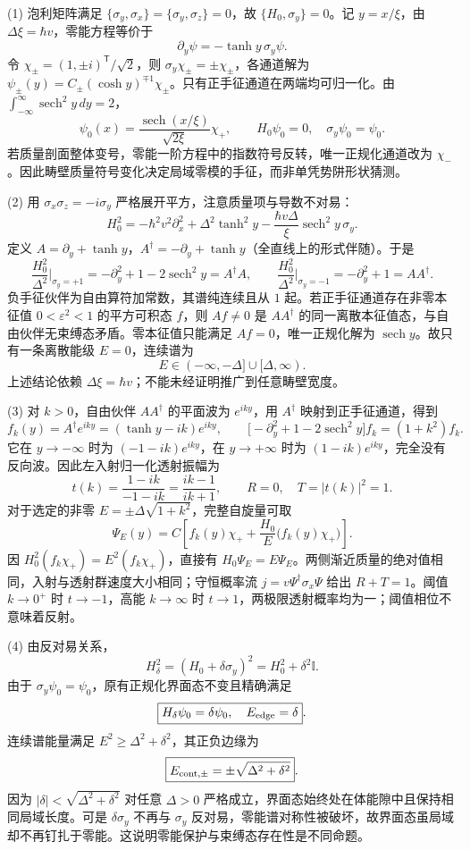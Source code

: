 (1) 泡利矩阵满足 \(\{\sigma_y,\sigma_x\}=\{\sigma_y,\sigma_z\}=0\)，故 \(\{H_0,\sigma_y\}=0\)。记 \(y=x/\xi\)，由 \(\Delta\xi=\hbar v\)，零能方程等价于
\[
\partial_y\psi=-\tanh y\,\sigma_y\psi .
\]
令 \(\chi_\pm=(1,\pm i)^{\mathsf T}/\sqrt2\)，则 \(\sigma_y\chi_\pm=\pm\chi_\pm\)，各通道解为 \(\psi_\pm(y)=C_\pm(\cosh y)^{\mp1}\chi_\pm\)。只有正手征通道在两端均可归一化。由 \(\int_{-\infty}^{\infty}\operatorname{sech}^2y\,dy=2\)，
\[
\boxed{\psi_0(x)=\frac{\operatorname{sech}(x/\xi)}{\sqrt{2\xi}}\chi_+},\qquad
\boxed{H_0\psi_0=0,\quad\sigma_y\psi_0=\psi_0}.
\]
若质量剖面整体变号，零能一阶方程中的指数符号反转，唯一正规化通道改为 \(\chi_-\)。因此畴壁质量符号变化决定局域零模的手征，而非单凭势阱形状猜测。

(2) 用 \(\sigma_x\sigma_z=-i\sigma_y\) 严格展开平方，注意质量项与导数不对易：
\[
H_0^2=-\hbar^2v^2\partial_x^2+\Delta^2\tanh^2y
-\frac{\hbar v\Delta}{\xi}\operatorname{sech}^2y\,\sigma_y .
\]
定义 \(A=\partial_y+\tanh y\)，\(A^\dagger=-\partial_y+\tanh y\)（全直线上的形式伴随）。于是
\[
\frac{H_0^2}{\Delta^2}\Big|_{\sigma_y=+1}
=-\partial_y^2+1-2\operatorname{sech}^2y=A^\dagger A,\qquad
\frac{H_0^2}{\Delta^2}\Big|_{\sigma_y=-1}
=-\partial_y^2+1=AA^\dagger .
\]
负手征伙伴为自由算符加常数，其谱纯连续且从 \(1\) 起。若正手征通道存在非零本征值 \(0<\varepsilon^2<1\) 的平方可积态 \(f\)，则 \(Af\ne0\) 是 \(AA^\dagger\) 的同一离散本征值态，与自由伙伴无束缚态矛盾。零本征值只能满足 \(Af=0\)，唯一正规化解为 \(\operatorname{sech}y\)。故只有一条离散能级 \(E=0\)，连续谱为
\[
\boxed{E\in(-\infty,-\Delta]\cup[\Delta,\infty)}.
\]
上述结论依赖 \(\Delta\xi=\hbar v\)；不能未经证明推广到任意畴壁宽度。

(3) 对 \(k>0\)，自由伙伴 \(AA^\dagger\) 的平面波为 \(e^{iky}\)，用 \(A^\dagger\) 映射到正手征通道，得到
\[
f_k(y)=A^\dagger e^{iky}=(\tanh y-ik)e^{iky},\qquad
\bigl[-\partial_y^2+1-2\operatorname{sech}^2y\bigr]f_k=(1+k^2)f_k.
\]
它在 \(y\to-\infty\) 时为 \((-1-ik)e^{iky}\)，在 \(y\to+\infty\) 时为 \((1-ik)e^{iky}\)，完全没有反向波。因此左入射归一化透射振幅为
\[
\boxed{t(k)=\frac{1-ik}{-1-ik}=\frac{ik-1}{ik+1}},\qquad
\boxed{R=0,\quad T=|t(k)|^2=1}.
\]
对于选定的非零 \(E=\pm\Delta\sqrt{1+k^2}\)，完整自旋量可取
\[
\Psi_E(y)=C\left[f_k(y)\chi_+
+\frac{H_0}{E}\bigl(f_k(y)\chi_+\bigr)\right].
\]
因 \(H_0^2(f_k\chi_+)=E^2(f_k\chi_+)\)，直接有 \(H_0\Psi_E=E\Psi_E\)。两侧渐近质量的绝对值相同，入射与透射群速度大小相同；守恒概率流 \(j=v\Psi^\dagger\sigma_x\Psi\) 给出 \(R+T=1\)。阈值 \(k\to0^+\) 时 \(t\to-1\)，高能 \(k\to\infty\) 时 \(t\to1\)，两极限透射概率均为一；阈值相位不意味着反射。

(4) 由反对易关系，
\[
H_\delta^2=(H_0+\delta\sigma_y)^2=H_0^2+\delta^2\mathbb I.
\]
由于 \(\sigma_y\psi_0=\psi_0\)，原有正规化界面态不变且精确满足
\[
\boxed{H_\delta\psi_0=\delta\psi_0,\quad E_{\rm edge}=\delta}.
\]
连续谱能量满足 \(E^2\ge\Delta^2+\delta^2\)，其正负边缘为
\[
\boxed{E_{\rm cont,\pm}=\pm\sqrt{\Delta^2+\delta^2}}.
\]
因为 \(|\delta|<\sqrt{\Delta^2+\delta^2}\) 对任意 \(\Delta>0\) 严格成立，界面态始终处在体能隙中且保持相同局域长度。可是 \(\delta\sigma_y\) 不再与 \(\sigma_y\) 反对易，零能谱对称性被破坏，故界面态虽局域却不再钉扎于零能。这说明零能保护与束缚态存在性是不同命题。